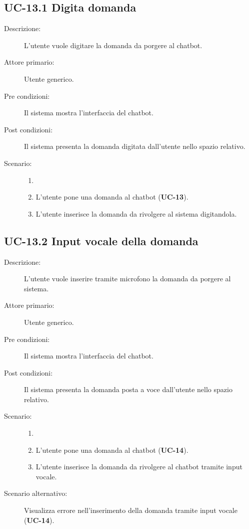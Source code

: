 \subsection{UC-13.1 Digita domanda}
\begin{description}
    \item[Descrizione:] L'utente vuole digitare la domanda da porgere al chatbot.
    \item[Attore primario:] Utente generico.
    \item[Pre condizioni:] Il sistema mostra l'interfaccia del chatbot.
    \item[Post condizioni:] Il sistema presenta la domanda digitata dall'utente nello spazio relativo.
    \item[Scenario:]
    \begin{enumerate}
        \item[]
        \item L’utente pone una domanda al chatbot (\textbf{UC-13}).
        \item L'utente inserisce la domanda da rivolgere al sistema digitandola.
    \end{enumerate}
\end{description}

\subsection{UC-13.2 Input vocale della domanda}
\begin{description}
    \item[Descrizione:] L'utente vuole inserire tramite microfono la domanda da porgere al sistema.
    \item[Attore primario:] Utente generico.
    \item[Pre condizioni:] Il sistema mostra l'interfaccia del chatbot.
    \item[Post condizioni:] Il sistema presenta la domanda posta a voce dall'utente nello spazio relativo.
    \item[Scenario:]
    \begin{enumerate}
        \item[]
        \item L’utente pone una domanda al chatbot (\textbf{UC-14}).
        \item L'utente inserisce la domanda da rivolgere al chatbot tramite input vocale.
    \end{enumerate}
    \item[Scenario alternativo:] Visualizza errore nell'inserimento della domanda tramite input vocale (\textbf{UC-14}).
\end{description}

